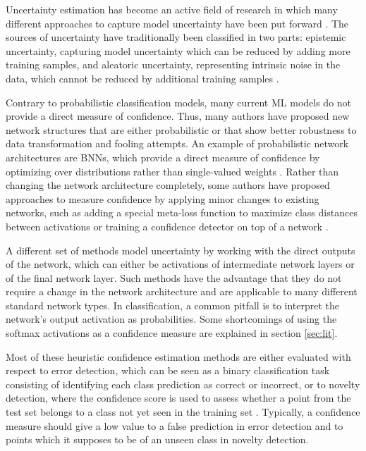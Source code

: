 \documentclass[10pt]{article}
\begin{document}
Uncertainty estimation has become an active field of research in which many different approaches to capture model uncertainty have been put forward \cite{Gal2016Uncertainty, Choi2017UncertaintyAwareLF, KendallG17, subramanya, leibig2017, Sun2018KSconfA}. The sources of uncertainty have traditionally been classified in two parts: epistemic uncertainty, capturing model uncertainty which can be reduced by adding more training samples, and aleatoric uncertainty, representing intrinsic noise in the data, which cannot be reduced by additional training samples \cite{KendallG17}. 

Contrary to probabilistic classification models, many current \gls{ML} models do not provide a direct measure of confidence. Thus, many authors have proposed new network structures that are either probabilistic or that show better robustness to data transformation and fooling attempts. An example of probabilistic network architectures are \glspl{BNN}, which provide a direct measure of confidence by optimizing over distributions rather than single-valued weights \cite{Gal2016Uncertainty, KendallG17}. Rather than changing the network architecture completely, some authors have proposed approaches to measure confidence by applying minor changes to existing networks, such as adding a special meta-loss function to maximize class distances between activations \cite{mandelbaum17} or training a confidence detector on top of a network \cite{Bahat_2018}.  

A different set of methods model uncertainty by working with the direct outputs of the network, which can either be activations of intermediate network layers or of the final network layer. Such methods have the advantage that they do not require a change in the network architecture and are applicable to many different standard network types. In classification, a common pitfall is to interpret the network's output activation as probabilities. Some shortcomings of using the softmax activations as a confidence measure are explained in section \ref{sec:lit}.

Most of these heuristic confidence estimation methods are either evaluated with respect to error detection, which can be seen as a binary classification task consisting of identifying each class prediction as correct or incorrect, or to novelty detection, where the confidence score is used to assess whether a point from the test set belongs to a class not yet seen in the training set \cite{mandelbaum17, deMorsier2014thesis}. Typically, a confidence measure should give a low value to a false prediction in error detection and to points which it supposes to be of an unseen class in novelty detection.
\end{document}
